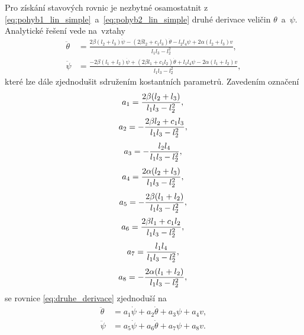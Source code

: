 \documentclass[conference]{IEEEtran}
\begin{document}
Pro získání stavových rovnic je nezbytné osamostatnit z \eqref{eq:pohyb1_lin_simple}~a~\eqref{eq:pohyb2_lin_simple}
druhé derivace veličin $\theta$~a~$\psi$. Analytické řešení vede na~vztahy
\begin{equation}
    \begin{split}
        \ddot{\theta} & = \frac{2\beta (l_2 + l_3) \dot{\psi}  - (2 \beta l_2 + c_1 l_3) \dot{\theta} - l_2 l_4 \psi + 2 \alpha (l_2 + l_3) v}{l_1 l_3 - l_2^2}, \\
        \ddot{\psi} &= \frac{- 2 \beta (l_1 + l_2) \dot{\psi} + (2 \beta l_1 + c_1 l_2)\dot{\theta}  + l_1 l_4 \psi - 2 \alpha (l_1 + l_2) v}{l_1 l_3 - l_2^2},
        \label{eq:druhe_derivace}
    \end{split}
\end{equation}
které lze dále zjednodušit sdružením kostantních parametrů. Zavedením označení
\begin{equation*}
    a_1 = \frac{2\beta (l_2 + l_3)}{l_1 l_3 - l_2^2}, \\
\end{equation*}
\begin{equation*}
    a_2 = -\frac{2 \beta l_2 + c_1 l_3}{l_1 l_3 - l_2^2}, \\
\end{equation*}
\begin{equation*}
    a_3 = -\frac{l_2 l_4}{l_1 l_3 - l_2^2}, \\
\end{equation*}
\begin{equation*}
    a_4 = \frac{2 \alpha (l_2 + l_3)}{l_1 l_3 - l_2^2}, \\
\end{equation*}
\begin{equation*}
    a_5 = -\frac{2 \beta (l_1 + l_2)}{l_1 l_3 - l_2^2}, \\
\end{equation*}
\begin{equation*}
    a_6 = \frac{2 \beta l_1 + c_1 l_2}{l_1 l_3 - l_2^2}, \\
\end{equation*}
\begin{equation*}
    a_7 = \frac{ l_1 l_4 }{l_1 l_3 - l_2^2}, \\
\end{equation*}
\begin{equation*}
    a_8 = -\frac{2 \alpha (l_1 + l_2)}{l_1 l_3 - l_2^2}, \\
\end{equation*}
se rovnice \eqref{eq:druhe_derivace} zjednoduší na
\begin{equation}
    \begin{split}
        \ddot{\theta} & = a_1 \dot{\psi} + a_2  \dot{\theta} + a_3  \psi + a_4  v, \\
        \ddot{\psi} &= a_5  \dot{\psi} + a_6  \dot {\theta} + a_7  \psi + a_8  v.
        \label{eq:druhe_derivace_easy}
    \end{split}
\end{equation}
\end{document}
